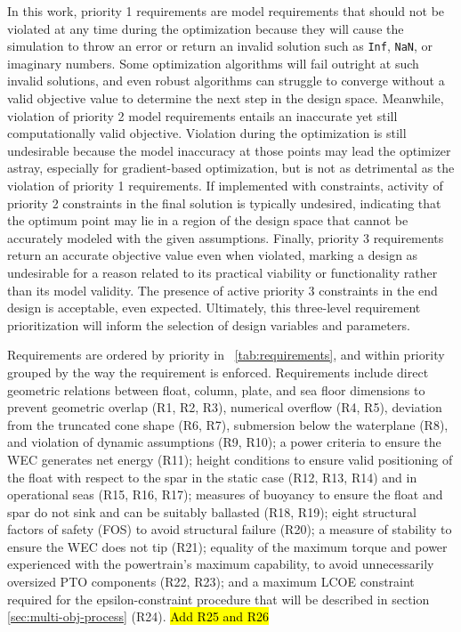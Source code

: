 In this work, priority 1 requirements are model requirements that should not be violated at any time during the optimization because they will cause the simulation to throw an error or return an invalid solution such as \texttt{Inf}, \texttt{NaN}, or imaginary numbers. Some optimization algorithms will fail outright at such invalid solutions, and even robust algorithms can struggle to converge without a valid objective value to determine the next step in the design space. Meanwhile, violation of priority 2 model requirements entails an inaccurate yet still computationally valid objective. Violation during the optimization is still undesirable because the model inaccuracy at those points may lead the optimizer astray, especially for gradient-based optimization, but is not as detrimental as the violation of priority 1 requirements. If implemented with constraints, activity of priority 2 constraints in the final solution is typically undesired, indicating that the optimum point may lie in a region of the design space that cannot be accurately modeled with the given assumptions. Finally, priority 3 requirements return an accurate objective value even when violated, marking a design as undesirable for a reason related to its practical viability or functionality rather than its model validity. The presence of active priority 3 constraints in the end design is acceptable, even expected. Ultimately, this three-level requirement prioritization will inform the selection of design variables and parameters.

Requirements are ordered by priority in \tablename~\ref{tab:requirements}, and within priority grouped by the way the requirement is enforced. Requirements include direct geometric relations between float, column, plate, and sea floor dimensions to prevent geometric overlap (R1, R2, R3), numerical overflow (R4, R5), deviation from the truncated cone shape (R6, R7), submersion below the waterplane (R8), and violation of dynamic assumptions (R9, R10); a power criteria to ensure the WEC generates net energy (R11); height conditions to ensure valid positioning of the float with respect to the spar in the static case (R12, R13, R14) and in operational seas (R15, R16, R17); measures of buoyancy to ensure the float and spar do not sink and can be suitably ballasted (R18, R19); eight structural factors of safety (FOS) to avoid structural failure (R20); a measure of stability to ensure the WEC does not tip (R21); equality of the maximum torque and power experienced with the powertrain's maximum capability, to avoid unnecessarily oversized PTO components (R22, R23); and a maximum LCOE constraint required for the epsilon-constraint procedure that will be described in section \ref{sec:multi-obj-process} (R24). \hl{Add R25 and R26}

